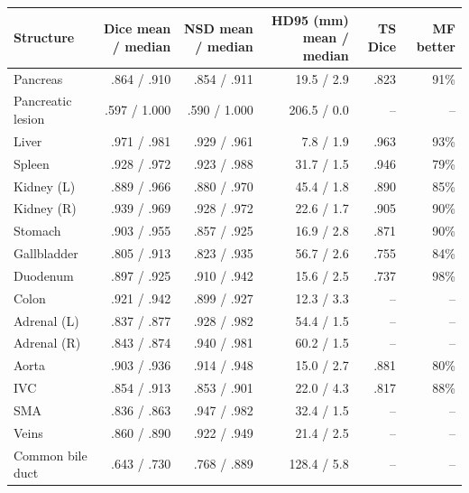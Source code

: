 \begin{tabular}{lrrrrr}
\toprule
Structure & Dice mean / median & NSD mean / median & HD95 (mm) mean / median & TS Dice & MF better \\
\midrule
Pancreas & .864 / .910 & .854 / .911 & 19.5 / 2.9 & .823 & 91\% \\
Pancreatic lesion & .597 / 1.000 & .590 / 1.000 & 206.5 / 0.0 & -- & -- \\
Liver & .971 / .981 & .929 / .961 & 7.8 / 1.9 & .963 & 93\% \\
Spleen & .928 / .972 & .923 / .988 & 31.7 / 1.5 & .946 & 79\% \\
Kidney (L) & .889 / .966 & .880 / .970 & 45.4 / 1.8 & .890 & 85\% \\
Kidney (R) & .939 / .969 & .928 / .972 & 22.6 / 1.7 & .905 & 90\% \\
Stomach & .903 / .955 & .857 / .925 & 16.9 / 2.8 & .871 & 90\% \\
Gallbladder & .805 / .913 & .823 / .935 & 56.7 / 2.6 & .755 & 84\% \\
Duodenum & .897 / .925 & .910 / .942 & 15.6 / 2.5 & .737 & 98\% \\
Colon & .921 / .942 & .899 / .927 & 12.3 / 3.3 & -- & -- \\
Adrenal (L) & .837 / .877 & .928 / .982 & 54.4 / 1.5 & -- & -- \\
Adrenal (R) & .843 / .874 & .940 / .981 & 60.2 / 1.5 & -- & -- \\
Aorta & .903 / .936 & .914 / .948 & 15.0 / 2.7 & .881 & 80\% \\
IVC & .854 / .913 & .853 / .901 & 22.0 / 4.3 & .817 & 88\% \\
SMA & .836 / .863 & .947 / .982 & 32.4 / 1.5 & -- & -- \\
Veins & .860 / .890 & .922 / .949 & 21.4 / 2.5 & -- & -- \\
Common bile duct & .643 / .730 & .768 / .889 & 128.4 / 5.8 & -- & -- \\
\bottomrule
\end{tabular}
